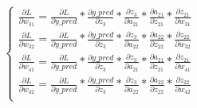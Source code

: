 \documentclass[12pt,a4paper]{article}
\begin{document}
\begin{eqnarray}
  \left\{
  \begin{aligned}
    \frac{\partial L}{\partial w_\text{31}} = \frac{\partial L}{\partial y\_pred} * \frac{\partial y\_pred}{\partial z_3} * \frac{\partial z_3}{\partial a_\text{21}} * \frac{\partial a_\text{21}}{\partial z_\text{21}} * \frac{\partial z_\text{21}}{\partial w_\text{31}} \\
    \frac{\partial L}{\partial w_\text{32}} = \frac{\partial L}{\partial y\_pred} * \frac{\partial y\_pred}{\partial z_3} * \frac{\partial z_3}{\partial a_\text{22}} * \frac{\partial a_\text{22}}{\partial z_\text{22}} * \frac{\partial z_\text{22}}{\partial w_\text{32}} \\
    \frac{\partial L}{\partial w_\text{41}} = \frac{\partial L}{\partial y\_pred} * \frac{\partial y\_pred}{\partial z_3} * \frac{\partial z_3}{\partial a_\text{21}} * \frac{\partial a_\text{21}}{\partial z_\text{21}} * \frac{\partial z_\text{21}}{\partial w_\text{41}} \\
    \frac{\partial L}{\partial w_\text{42}} = \frac{\partial L}{\partial y\_pred} * \frac{\partial y\_pred}{\partial z_3} * \frac{\partial z_3}{\partial a_\text{22}} * \frac{\partial a_\text{22}}{\partial z_\text{22}} * \frac{\partial z_\text{22}}{\partial w_\text{42}} \\
  \end{aligned}
  \right.
  \label{eq: L_to_W2}
\end{eqnarray}
\end{document}
